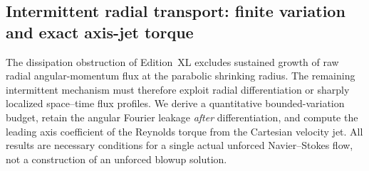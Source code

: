 
\subsection{Intermittent radial transport: finite variation and exact axis-jet torque}
\label{sec:xli-intermittent}

The dissipation obstruction of Edition~XL excludes sustained growth of
raw radial angular-momentum flux at the parabolic shrinking radius.
The remaining intermittent mechanism must therefore exploit radial
differentiation or sharply localized space--time flux profiles.
We derive a quantitative bounded-variation budget, retain the angular
Fourier leakage \emph{after} differentiation, and compute the leading
axis coefficient of the Reynolds torque from the Cartesian velocity jet.
All results are necessary conditions for a single actual unforced
Navier--Stokes flow, not a construction of an unforced blowup solution.

